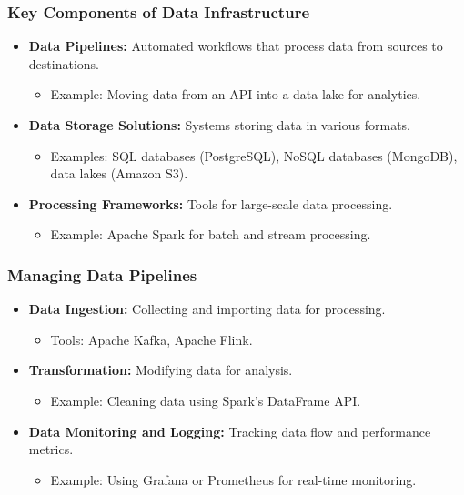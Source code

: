 \documentclass[aspectratio=169]{beamer}
\begin{document}
\begin{frame}
    \frametitle{Key Components of Data Infrastructure}
    \begin{itemize}
        \item \textbf{Data Pipelines:} Automated workflows that process data from sources to destinations.
        \begin{itemize}
            \item Example: Moving data from an API into a data lake for analytics.
        \end{itemize}
        
        \item \textbf{Data Storage Solutions:} Systems storing data in various formats.
        \begin{itemize}
            \item Examples: SQL databases (PostgreSQL), NoSQL databases (MongoDB), data lakes (Amazon S3).
        \end{itemize}
        
        \item \textbf{Processing Frameworks:} Tools for large-scale data processing.
        \begin{itemize}
            \item Example: Apache Spark for batch and stream processing.
        \end{itemize}
    \end{itemize}
\end{frame}

\begin{frame}
    \frametitle{Managing Data Pipelines}
    \begin{itemize}
        \item \textbf{Data Ingestion:} Collecting and importing data for processing.
        \begin{itemize}
            \item Tools: Apache Kafka, Apache Flink.
        \end{itemize}
        
        \item \textbf{Transformation:} Modifying data for analysis.
        \begin{itemize}
            \item Example: Cleaning data using Spark’s DataFrame API.
        \end{itemize}
        
        \item \textbf{Data Monitoring and Logging:} Tracking data flow and performance metrics.
        \begin{itemize}
            \item Example: Using Grafana or Prometheus for real-time monitoring.
        \end{itemize}
    \end{itemize}
\end{frame}
\end{document}
